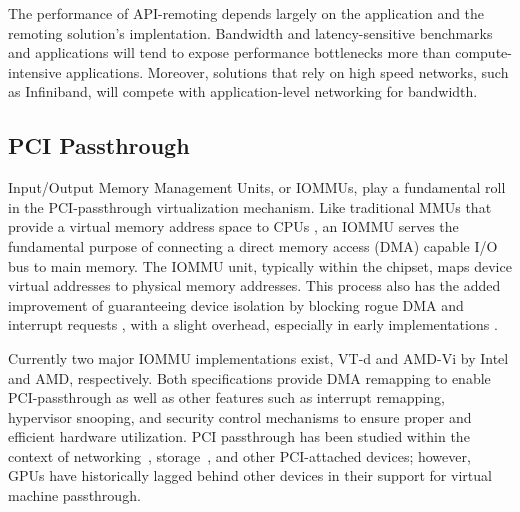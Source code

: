 The performance of API-remoting depends largely on the application and the
remoting solution's implentation.  Bandwidth
and latency-sensitive benchmarks and applications will tend to expose performance bottlenecks
more than compute-intensive applications.  Moreover, solutions
that rely on high speed networks, such as Infiniband, will compete with
application-level networking for bandwidth.  


\subsection{PCI Passthrough}

Input/Output Memory Management Units, or IOMMUs, play a fundamental roll in the
PCI-passthrough virtualization mechanism. Like traditional MMUs that provide a
virtual memory address space to CPUs \cite{Jacob1998}, an IOMMU serves the
fundamental purpose of connecting a direct memory access (DMA) capable I/O bus
to main memory. The IOMMU unit, typically within the chipset, maps device
virtual addresses to physical memory addresses. This process also has the added
improvement of guaranteeing device isolation by blocking rogue DMA and interrupt requests \cite{yassour2008direct}, with a slight overhead, especially in early implementations \cite{ben2007price}. 


Currently two major IOMMU implementations exist, \mbox{VT-d}  and
{AMD-Vi} by Intel and AMD, respectively. Both
specifications provide DMA remapping to enable PCI-passthrough as well as other
features such as interrupt remapping, hypervisor snooping, and security control
mechanisms to ensure proper and efficient hardware utilization. PCI passthrough has been studied within the context of networking~\cite{liu2010ipdps}, storage~\cite{jujjuri2010virtfs}, and other PCI-attached devices; however, GPUs have historically lagged behind other devices in their support for virtual
machine passthrough.  


